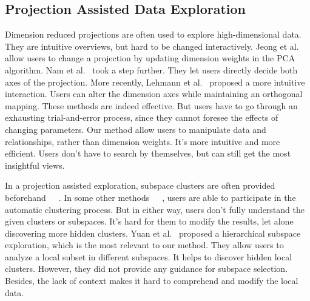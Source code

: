 \subsection{Projection Assisted Data Exploration}
Dimension reduced projections are often used to explore high-dimensional data. They are intuitive overviews, but hard to be changed interactively. Jeong et al.~\cite{DBLP:journals/cgf/JeongZFRC09} allow users to change a projection by updating dimension weights in the PCA algorithm. Nam et al.~\cite{DBLP:journals/tvcg/NamM13} took a step further. They let users directly decide both axes of the projection. More recently, Lehmann et al.~\cite{DBLP:journals/tvcg/LehmannT13} proposed a more intuitive interaction. Users can alter the dimension axes while maintaining an orthogonal mapping. These methods are indeed effective. But users have to go through an exhausting trial-and-error process, since they cannot foresee the effects of changing parameters. Our method allow users to manipulate data and relationships, rather than dimension weights. It's more intuitive and more efficient. Users don't have to search by themselves, but can still get the most insightful views.

In a projection assisted exploration, subspace clusters are often provided beforehand~\cite{DBLP:conf/ieeevast/TatuMFBSSK12}~\cite{DBLP:journals/tvcg/NamM13}~\cite{DBLP:journals/cgf/LiuWTBP15}. In some other methods~\cite{DBLP:journals/tois/ChenL06}~\cite{DBLP:conf/ieeevast/NamHMZI07}~\cite{DBLP:conf/ieeevast/TatuMFBSSK12}, users are able to participate in the automatic clustering process. But in either way, users don't fully understand the given clusters or subspaces. It's hard for them to modify the results, let alone discovering more hidden clusters. Yuan et al.~\cite{DBLP:journals/tvcg/YuanRWG13} proposed a hierarchical subspace exploration, which is the most relevant to our method. They allow users to analyze a local subset in different subspaces. It helps to discover hidden local clusters. However, they did not provide any guidance for subspace selection. Besides, the lack of context makes it hard to comprehend and modify the local data.

